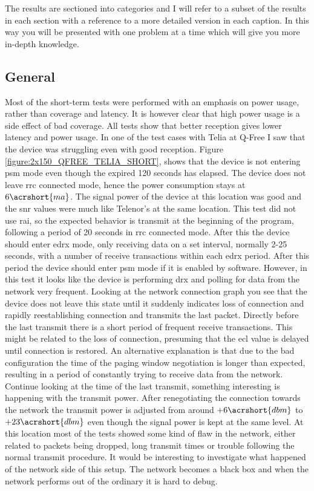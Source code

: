 \documentclass[USenglish]{ifimaster}  %
\begin{document}
The results are sectioned into categories and I will refer to a subset of the results in each section with a reference to a more detailed version in each caption. In this way you will be presented with one problem at a time which will give you more in-depth knowledge.

\subsection{General} \label{ssection:generaltest}
Most of the short-term tests were performed with an emphasis on power usage, rather than coverage and latency. It is however clear that high power usage is a side effect of bad coverage. All tests show that better reception gives lower latency and power usage. In one of the test cases with Telia at Q-Free I saw that the device was struggling even with good reception. Figure \vref{figure:2x150_QFREE_TELIA_SHORT}, shows that the device is not entering \acrshort{psm} mode even though the expired 120 seconds has elapsed. The device does not leave \acrshort{rrc} connected mode, hence the power consumption stays at ${6 \acrshort{ma}}$. The signal power of the device at this location was good and the \acrshort{snr} values were much like Telenor's at the same location. This test did not use \acrshort{rai}, so the expected behavior is transmit at the beginning of the program, following a period of 20 seconds in \acrshort{rrc} connected mode. After this the device should enter \acrshort{edrx} mode, only receiving data on a set interval, normally 2-25 seconds, with a number of receive transactions within each \acrshort{edrx} period. After this period the device should enter \acrshort{psm} mode if it is enabled by software.
However, in this test it looks like the device is performing \acrshort{drx} and polling for data from the network very frequent. Looking at the network connection graph you see that the device does not leave this state until it suddenly indicates loss of connection and rapidly reestablishing connection and transmits the last packet. Directly before the last transmit there is a short period of frequent receive transactions. This might be related to the loss of connection, presuming that the \acrshort{ecl} value is delayed until connection is restored. An alternative explanation is that due to the bad configuration the time of the paging window negotiation is longer than expected, resulting in a period of constantly trying to receive data from the network. Continue looking at the time of the last transmit, something interesting is happening with the transmit power. After renegotiating the connection towards the network the transmit power is adjusted from around ${+6 \acrshort{dbm}}$ to ${+23 \acrshort{dbm}}$ even though the signal power is kept at the same level. At this location most of the tests showed some kind of flaw in the network, either related to packets being dropped, long transmit times or trouble following the normal transmit procedure. It would be interesting to investigate what happened of the network side of this setup. The network becomes a black box and when the network performs out of the ordinary it is hard to debug.
\end{document}
